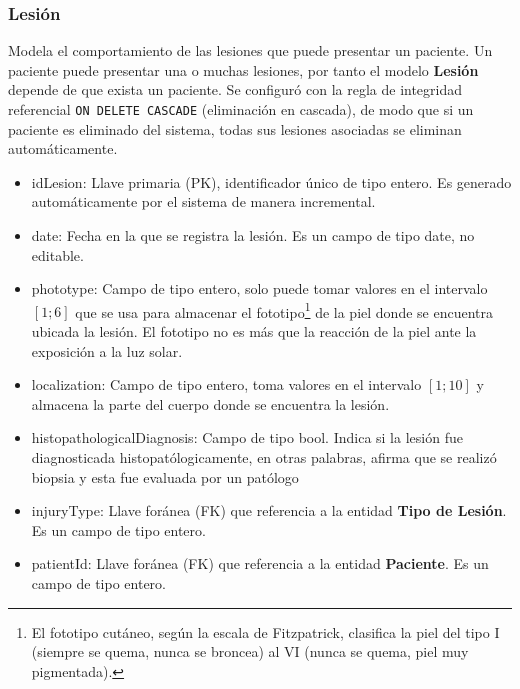 \subsubsection{Lesi\'on}
Modela el comportamiento de las lesiones que puede presentar un paciente. Un
paciente puede presentar una o muchas lesiones, por tanto el modelo \textbf{Lesi\'on}
depende de que exista un paciente. Se configuró con la regla de integridad referencial 
\texttt{ON DELETE CASCADE} (eliminación en cascada)\cite{cascada}, de modo que si un paciente es 
eliminado del sistema, todas sus lesiones asociadas se eliminan automáticamente.
\begin{itemize}
    \item idLesion: Llave primaria (PK), identificador \'unico de tipo entero. Es generado autom\'aticamente por el sistema de manera incremental.
    \item date: Fecha en la que se registra la lesi\'on. Es un campo de tipo date, no editable.
    \item phototype: Campo de tipo entero, solo puede tomar valores en el intervalo $[1;6]$ que se usa para almacenar el fototipo\footnote{El fototipo cutáneo, según la escala de Fitzpatrick, clasifica la piel del tipo I (siempre se quema, nunca se broncea) al VI (nunca se quema, piel muy pigmentada).} de la piel donde se encuentra ubicada la lesi\'on. El fototipo no es m\'as que la reacci\'on de la piel ante la exposici\'on a la luz solar.
    \item localization: Campo de tipo entero, toma valores en el intervalo $[1;10]$ y almacena la parte del cuerpo donde se encuentra la lesi\'on. 
    \item histopathologicalDiagnosis: Campo de tipo bool. Indica si la lesi\'on fue diagnosticada histopat\'ologicamente, en otras palabras, afirma que se realizó biopsia y esta fue evaluada por un patólogo
    \item injuryType: Llave for\'anea (FK) que referencia a la entidad \textbf{Tipo de Lesi\'on}. Es un campo de tipo entero.
    \item patientId: Llave for\'anea (FK) que referencia a la entidad \textbf{Paciente}. Es un campo de tipo entero.
\end{itemize}

